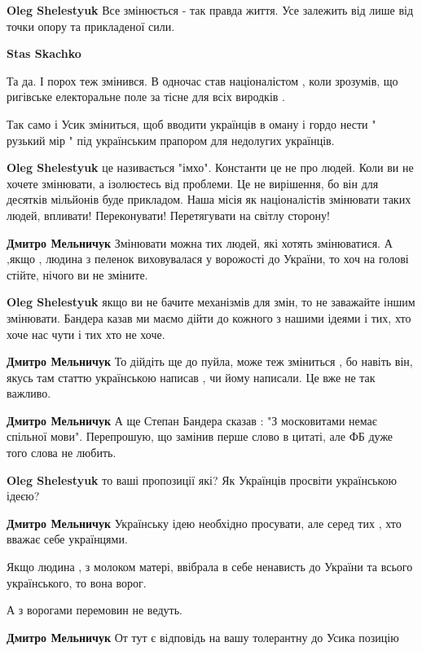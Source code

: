 \begin{itemize}
\begin{itemize}
\textbf{Oleg Shelestyuk} Все змінюється - так правда життя. Усе залежить від лише від точки опору та прикладеної сили.

\textbf{Stas Skachko}

Та да. І порох теж змінився. В одночас став націоналістом , коли зрозумів, що
ригівське електоральне поле за тісне для всіх виродків .

Так само і Усик зміниться, щоб вводити українців в оману і гордо нести "
рузький мір " під українським прапором для недолугих українців.

\textbf{Oleg Shelestyuk} це називається "імхо".
Константи це не про людей.
Коли ви не хочете змінювати, а ізолюєтесь від проблеми. Це не вирішення, бо він для десятків мільйонів буде прикладом. Наша місія як націоналістів змінювати таких людей, впливати! Переконувати! Перетягувати на світлу сторону!

\textbf{Дмитро Мельничук}
Змінювати можна тих людей, які хотять змінюватися.
А ,якщо , людина з пеленок виховувалася у ворожості до України, то хоч на голові стійте, нічого ви не зміните.

\textbf{Oleg Shelestyuk} якщо ви не бачите механізмів для змін, то не заважайте іншим змінювати.
Бандера казав ми маємо дійти до кожного з нашими ідеями і тих, хто хоче нас чути і тих хто не хоче.

\textbf{Дмитро Мельничук}
То дійдіть ще до пуйла, може теж зміниться , бо навіть він, якусь там статтю українською написав , чи йому написали.
Це вже не так важливо.

\textbf{Дмитро Мельничук}
А ще Степан Бандера сказав : "З московитами немає спільної мови".
Перепрошую, що замінив перше слово в цитаті, але ФБ дуже того слова не любить.

\textbf{Oleg Shelestyuk} то ваші пропозиції які?
Як Українців просвіти українською ідеєю?

\textbf{Дмитро Мельничук}
Українську ідею необхідно просувати, але серед тих , хто вважає себе українцями.

Якщо людина , з молоком матері, ввібрала в себе ненависть до України та всього українського, то вона ворог.

А з ворогами перемовин не ведуть.

\textbf{Дмитро Мельничук}
От тут є відповідь на вашу толерантну до Усика позицію


\end{itemize}
\end{itemize}
